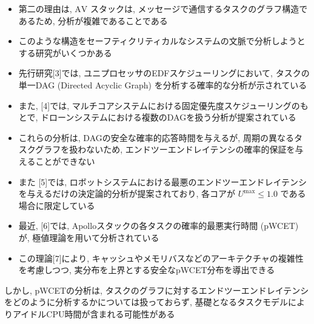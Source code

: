 \begin{frame}{}
    \begin{itemize}
        \item 第二の理由は, $\mathrm{AV}$ スタックは, メッセージで通信するタスクのグラフ構造であるため, 分析が複雑であることである
        \item このような構造をセーフティクリティカルなシステムの文脈で分析しようとする研究がいくつかある
        \item 先行研究[3]では, ユニプロセッサのEDFスケジューリングにおいて, タスクの単一DAG (Directed Acyclic Graph) を分析する確率的な分析が示されている
        \item また, [4]では, マルチコアシステムにおける固定優先度スケジューリングのもとで, ドローンシステムにおける複数のDAGを扱う分析が提案されている
    \end{itemize}
\end{frame}

\begin{frame}{}
    \begin{itemize}
        \item これらの分析は, DAGの安全な確率的応答時間を与えるが, 周期の異なるタスクグラフを扱わないため, エンドツーエンドレイテンシの確率的保証を与えることができない
        \item また [5]では, ロボットシステムにおける最悪のエンドツーエンドレイテンシを与えるだけの決定論的分析が提案されており, 各コアが $U^{\max } \leq 1.0$ である場合に限定している
        \item 最近, [6]では, Apolloスタックの各タスクの確率的最悪実行時間 (pWCET) が, 極値理論を用いて分析されている
        \item この理論[7]により, キャッシュやメモリバスなどのアーキテクチャの複雑性を考慮しつつ, 実分布を上界とする安全なpWCET分布を導出できる
    \end{itemize}
\end{frame}

\begin{frame}{}
    しかし, pWCETの分析は, タスクのグラフに対するエンドツーエンドレイテンシをどのように分析するかについては扱っておらず, 基礎となるタスクモデルによりアイドルCPU時間が含まれる可能性がある
\end{frame}

